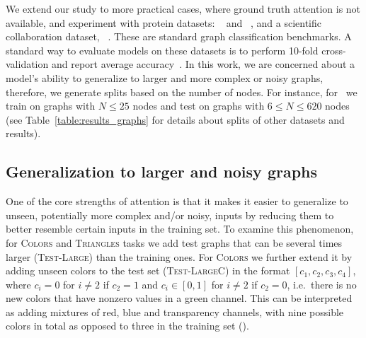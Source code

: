 \label{sec:graph_data}
We extend our study to more practical cases, where ground truth attention is not available, and experiment with protein datasets: \proteins~\citep{borgwardt2005protein} and \dd~\citep{dobson2003distinguishing}, and a scientific collaboration dataset, \collab~\citep{leskovec2007graph, shrivastava2014new}.
These are standard graph classification benchmarks.
A standard way to evaluate models on these datasets is to perform 10-fold cross-validation and report average accuracy~\citep{yanardag2015deep, ying2018hierarchical}.
In this work, we are concerned about a model's ability to generalize to larger and more complex or noisy graphs, therefore, we generate splits based on the number of nodes. For instance, for \proteins~we train on graphs with $ N \leq 25$ nodes and test on graphs with $ 6 \leq N \leq 620$ nodes (see Table~\ref{table:results_graphs} for details about splits of other datasets and results).


\subsection{Generalization to larger and noisy graphs}
One of the core strengths of attention is that it makes it easier to generalize to unseen, potentially more complex and/or noisy, inputs by reducing them to better resemble certain inputs in the training set. To examine this phenomenon, for \textsc{Colors} and \textsc{Triangles} tasks we add test graphs that can be several times larger (\textsc{Test-Large}) than the training ones. For \textsc{Colors} we further extend it by adding unseen colors to the test set (\textsc{Test-LargeC}) in the format $[c_1, c_2, c_3, c_4]$, where $c_i=0$ for $i \neq 2$ if $c_2=1$ and $c_i \in [0,1]$ for $i \neq 2$ if $c_2=0$, i.e.~there is no new colors that have nonzero values in a green channel. This can be interpreted as adding mixtures of red, blue and transparency channels, with nine possible colors in total as opposed to three in the training set (\fig{\ref{fig:test_subsets}}).


